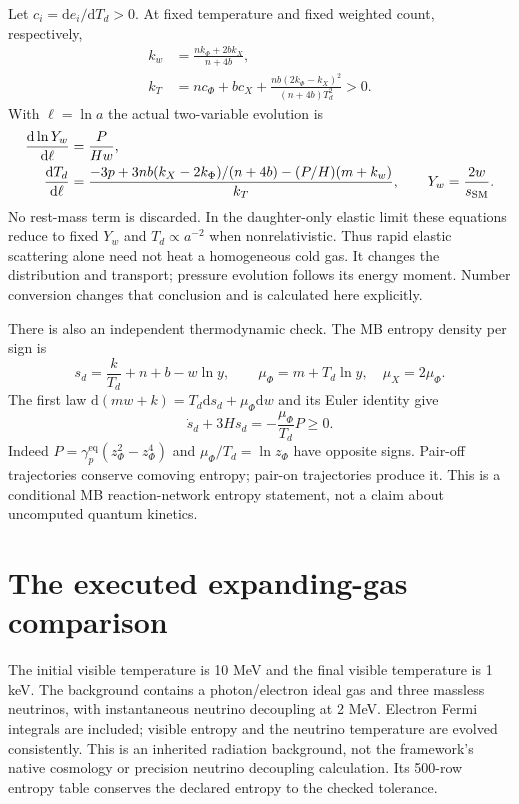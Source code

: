 \documentclass[11pt]{article}
\newcommand{\dd}{\mathrm d}
\newcommand{\eq}{\mathrm{eq}}
\begin{document}
Let $c_i=\dd e_i/\dd T_d>0$. At fixed temperature and fixed weighted count,
respectively,
\begin{align}
 k_w&=\frac{nk_\Phi+2bk_X}{n+4b},\\
 k_T&=nc_\Phi+bc_X+
 \frac{nb(2k_\Phi-k_X)^2}{(n+4b)T_d^2}>0.
\end{align}
With $\ell=\ln a$ the actual two-variable evolution is
\begin{align}
 \frac{\dd\ln Y_w}{\dd\ell}&=\frac{P}{Hw},\\
 \frac{\dd T_d}{\dd\ell}&=
 \frac{-3p+3nb(k_X-2k_\Phi)/(n+4b)-(P/H)(m+k_w)}{k_T},\qquad
 Y_w=\frac{2w}{s_{\rm SM}}.
\end{align}
No rest-mass term is discarded. In the daughter-only elastic limit these
equations reduce to fixed $Y_w$ and $T_d\propto a^{-2}$ when nonrelativistic.
Thus rapid elastic scattering alone need not heat a homogeneous cold gas.
It changes the distribution and transport; pressure evolution follows its
energy moment. Number conversion changes that conclusion and is calculated
here explicitly.

There is also an independent thermodynamic check. The MB entropy density
per sign is
\begin{equation}
 s_d=\frac{k}{T_d}+n+b-w\ln y,\qquad
 \mu_\Phi=m+T_d\ln y,\quad \mu_X=2\mu_\Phi.
\end{equation}
The first law $\dd(mw+k)=T_d\dd s_d+\mu_\Phi\dd w$ and its Euler
identity give
\begin{equation}
 \dot s_d+3Hs_d=-\frac{\mu_\Phi}{T_d}P\ge0.
\end{equation}
Indeed $P=\gamma_p^\eq(z_\Phi^2-z_\Phi^4)$ and
$\mu_\Phi/T_d=\ln z_\Phi$ have opposite signs. Pair-off trajectories
conserve comoving entropy; pair-on trajectories produce it. This is a
conditional MB reaction-network entropy statement, not a claim about
uncomputed quantum kinetics.

\section{The executed expanding-gas comparison}
The initial visible temperature is 10 MeV and the final visible temperature
is 1 keV. The background contains a photon/electron ideal gas and three
massless neutrinos, with instantaneous neutrino decoupling at 2 MeV.
Electron Fermi integrals are included; visible entropy and the neutrino
temperature are evolved consistently. This is an inherited radiation
background, not the framework's native cosmology or precision neutrino
decoupling calculation. Its 500-row entropy table conserves the declared
entropy to the checked tolerance.
\end{document}

